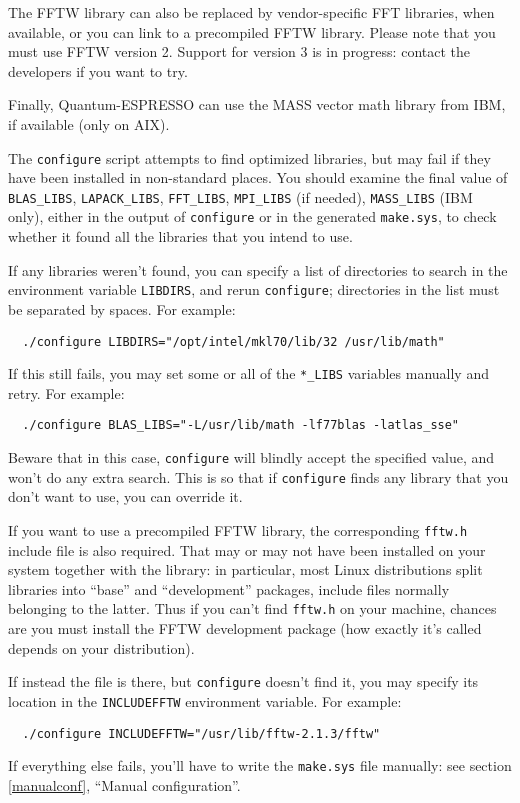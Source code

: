 \documentclass[12pt,a4paper]{article}
\begin{document}
The FFTW library can also be replaced by vendor-specific FFT
libraries, when available, or you can link to a precompiled FFTW
library.  Please note that you must use FFTW version 2.  Support for
version 3 is in progress: contact the developers if you want to try.

Finally, Quantum-ESPRESSO can use the MASS vector math library from
IBM, if available (only on AIX).

The \texttt{configure} script attempts to find optimized libraries,
but may fail if they have been installed in non-standard places.
You should examine the final value of \texttt{BLAS\_LIBS},
\texttt{LAPACK\_LIBS}, \texttt{FFT\_LIBS}, \texttt{MPI\_LIBS} (if
needed), \texttt{MASS\_LIBS} (IBM only), either in the output of
\texttt{configure} or in the generated \texttt{make.sys}, to check
whether it found all the libraries that you intend to use.

If any libraries weren't found, you can specify a list of directories
to search in the environment variable \texttt{LIBDIRS}, and rerun
\texttt{configure}; directories in the list must be separated by
spaces.  For example:
\begin{verbatim}
  ./configure LIBDIRS="/opt/intel/mkl70/lib/32 /usr/lib/math"
\end{verbatim}
If this still fails, you may set some or all of the \texttt{*\_LIBS}
variables manually and retry.  For example:
\begin{verbatim}
  ./configure BLAS_LIBS="-L/usr/lib/math -lf77blas -latlas_sse"
\end{verbatim}
Beware that in this case, \texttt{configure} will blindly accept the
specified value, and won't do any extra search.  This is so that if
\texttt{configure} finds any library that you don't want to use, you
can override it.

If you want to use a precompiled FFTW library, the corresponding
\texttt{fftw.h} include file is also required.
That may or may not have been installed on your system together with
the library: in particular, most Linux distributions split libraries
into ``base'' and ``development'' packages, include files normally
belonging to the latter.
Thus if you can't find \texttt{fftw.h} on your machine, chances are
you must install the FFTW development package (how exactly it's called
depends on your distribution).

If instead the file is there, but \texttt{configure} doesn't find it,
you may specify its location in the \texttt{INCLUDEFFTW} environment
variable.
For example:
\begin{verbatim}
  ./configure INCLUDEFFTW="/usr/lib/fftw-2.1.3/fftw"
\end{verbatim}
If everything else fails, you'll have to write the \texttt{make.sys}
file manually: see section \ref{manualconf}, ``Manual configuration''.
\end{document}
